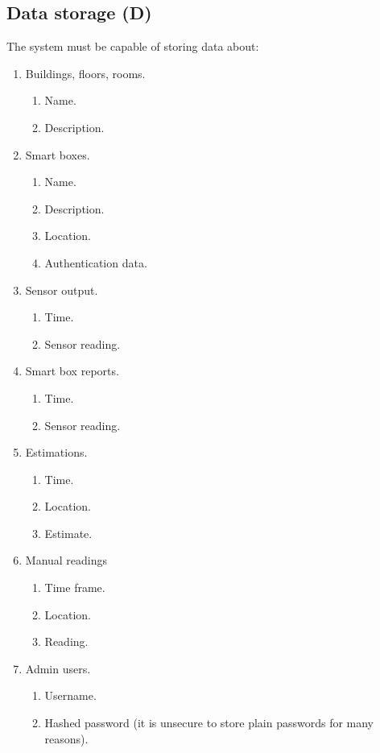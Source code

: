 \documentclass{l4proj}
\begin{document}
\subsection{Data storage (D)}
The system must be capable of storing data about: 
\begin{enumerate}
  \item Buildings, floors, rooms.
\begin{enumerate}
  \item Name.
  \item Description.
\end{enumerate}
  \item Smart boxes.
\begin{enumerate}
  \item Name.
  \item Description.
  \item Location.
  \item Authentication data.
\end{enumerate}
  \item Sensor output.
\begin{enumerate}  
  \item Time.
  \item Sensor reading.
\end{enumerate}
  \item Smart box reports.
\begin{enumerate} 
  \item Time.
  \item Sensor reading.
\end{enumerate}
  \item Estimations.
\begin{enumerate} 
  \item Time.
  \item Location.
  \item Estimate.
\end{enumerate}
  \item Manual readings
\begin{enumerate} 
  \item Time frame.
  \item Location.
  \item Reading.
\end{enumerate}
  \item Admin users.
\begin{enumerate} 
  \item Username.
  \item Hashed password (it is unsecure to store plain passwords for many reasons).
\end{enumerate}
\end{enumerate}
\end{document}
